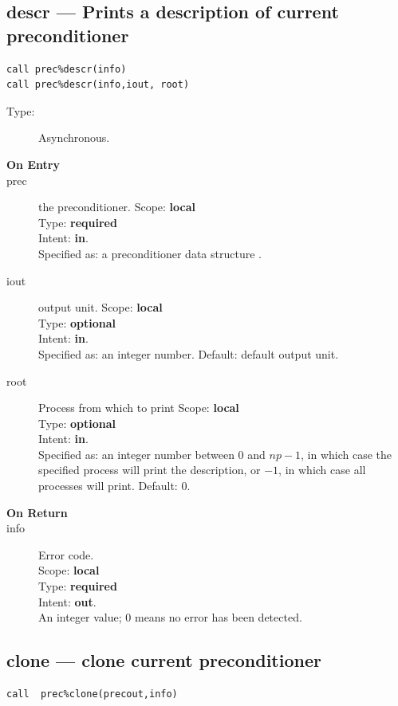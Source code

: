 \clearpage\subsection{descr --- Prints a description of current
  preconditioner}

\begin{verbatim}
call prec%descr(info)
call prec%descr(info,iout, root)
\end{verbatim}

\begin{description}
\item[Type:] Asynchronous.
\item[\bf On Entry]
\item[prec] the preconditioner.
Scope: {\bf local} \\
Type: {\bf required}\\
Intent: {\bf in}.\\
Specified as: a preconditioner data structure \precdata.
\item[iout] output unit.
Scope: {\bf local} \\
Type: {\bf optional}\\
Intent: {\bf in}.\\
Specified as: an integer number. Default: default output unit.
\item[root] Process from which to print
Scope: {\bf local} \\
Type: {\bf optional}\\
Intent: {\bf in}.\\
Specified as: an integer number between 0 and $np-1$, in which case
the specified process will print the description, or $-1$, in which case
all processes will print. Default: 0. 
\item[\bf On Return]
\item[info] Error code.\\
Scope: {\bf local} \\
Type: {\bf required} \\
Intent: {\bf out}.\\
An integer value; 0 means no error has been detected. 
\end{description}



\clearpage\subsection{clone --- clone  current
  preconditioner}
\begin{verbatim}
call  prec%clone(precout,info)
\end{verbatim}

